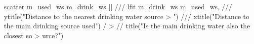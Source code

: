 scatter m_used_ws m_drink_ws  || ///
lfit m_drink_ws m_used_ws, ///
        ytitle("Distance to the nearest drinking water source
> ") ///
        xtitle("Distance to the main drinking source used") /
> //
        title("Is the main drinking water also the closest so
> urce?")
